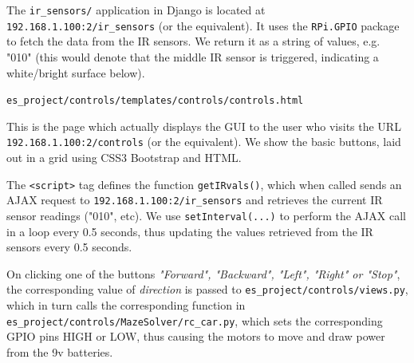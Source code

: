 \begin{description}[font=\quad $\circ$, topsep=6pt, itemsep=3em]
			The \texttt{ir\_sensors/} application in Django is located at \texttt{192.168.1.100:2/ir\_sensors} (or the equivalent). It uses the \texttt{RPi.GPIO} package to fetch the data from the IR sensors. We return it as a string of values, e.g. "010" (this would denote that the middle IR sensor is triggered, indicating a white/bright surface below).
		
		
		
	
		\item \texttt{es\_project/controls/templates/controls/controls.html}
			
		
		This is the page which actually displays the GUI to the user who visits the URL  \texttt{192.168.1.100:2/controls} (or the equivalent). We show the basic buttons, laid out in a grid using CSS3 Bootstrap and HTML. 
		
		The \texttt{<script>} tag defines the function \texttt{getIRvals()}, which when called sends an AJAX request to \texttt{192.168.1.100:2/ir\_sensors} and retrieves the current IR sensor readings ("010", etc). We use \texttt{setInterval(...)} to perform the AJAX call in a loop every 0.5 seconds, thus updating the values retrieved from the IR sensors every 0.5 seconds.
		
		On clicking one of the buttons \textit{"Forward", "Backward", "Left", "Right" or "Stop"}, the corresponding value of \textit{direction} is passed to \texttt{es\_project/controls/views.py}, which in turn calls the corresponding function in \texttt{es\_project/controls/MazeSolver/rc\_car.py}, which sets the corresponding GPIO pins HIGH or LOW, thus causing the motors to move and draw power from the 9v batteries.
		
					
			
		
	\end{description}

